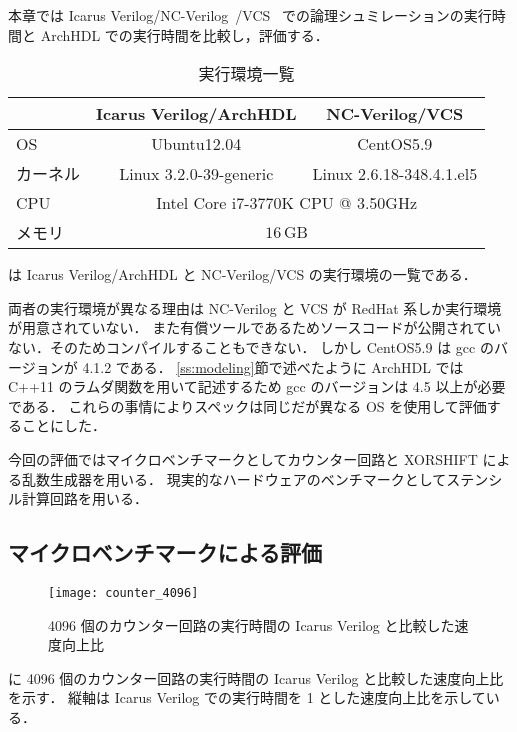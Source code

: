 本章では Icarus Verilog/NC-Verilog~\cite{ncverilog}/VCS~\cite{vcs}
での論理シュミレーションの実行時間と ArchHDL
での実行時間を比較し，評価する．

\begin{table}[t]
 \caption{実行環境一覧}
 \label{table:exec_env}
 \begin{center}
  \begin{tabular}{lcc} \toprule
         &  Icarus Verilog/ArchHDL  &  NC-Verilog/VCS   \\ \midrule
  OS     &  Ubuntu12.04             &  CentOS5.9        \\
  カーネル &  Linux 3.2.0-39-generic  &  Linux 2.6.18-348.4.1.el5   \\
  CPU    &  \multicolumn{2}{c}{Intel Core i7-3770K CPU @ 3.50GHz}   \\
  メモリ  &  \multicolumn{2}{c}{$16\,\mathrm{GB}$}  \\ \bottomrule
  \end{tabular}
 \end{center}
\end{table}

 は Icarus Verilog/ArchHDL と NC-Verilog/VCS
の実行環境の一覧である．

両者の実行環境が異なる理由は NC-Verilog と VCS が RedHat 系しか実行環境が用意されていない．
また有償ツールであるためソースコードが公開されていない．そのためコンパイルすることもできない．
しかし CentOS5.9 は gcc のバージョンが 4.1.2 である．
\ref{ss:modeling}節で述べたように ArchHDL では C++11 のラムダ関数を用いて記述するため gcc のバージョンは 4.5 以上が必要である．
これらの事情によりスペックは同じだが異なる OS を使用して評価することにした．

今回の評価ではマイクロベンチマークとしてカウンター回路と XORSHIFT による乱数生成器を用いる．
現実的なハードウェアのベンチマークとしてステンシル計算回路を用いる．


\subsection{マイクロベンチマークによる評価}

\begin{figure}[t]
 \centering
 \texttt{[image: counter\_4096]}
 \caption{4096 個のカウンター回路の実行時間の Icarus Verilog と比較した速度向上比}
 \label{fig:counter4096}
\end{figure}

 に 4096 個のカウンター回路の実行時間の Icarus Verilog と比較した速度向上比を示す．
縦軸は Icarus Verilog での実行時間を 1 とした速度向上比を示している．

